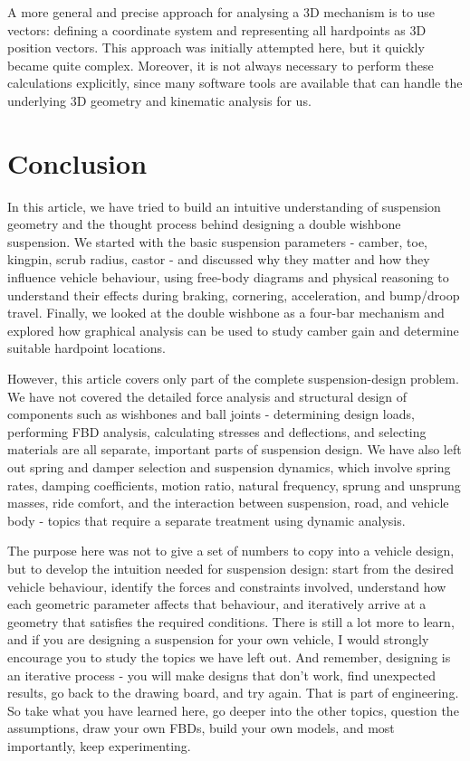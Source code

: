 \documentclass[12pt,a4paper]{article}
\begin{document}
A more general and precise approach for analysing a 3D mechanism is to use vectors: defining a coordinate system and representing all hardpoints as 3D position vectors. This approach was initially attempted here, but it quickly became quite complex. Moreover, it is not always necessary to perform these calculations explicitly, since many software tools are available that can handle the underlying 3D geometry and kinematic analysis for us.

\section{Conclusion}
In this article, we have tried to build an intuitive understanding of suspension geometry and the thought process behind designing a double wishbone suspension. We started with the basic suspension parameters - camber, toe, kingpin, scrub radius, castor - and discussed why they matter and how they influence vehicle behaviour, using free-body diagrams and physical reasoning to understand their effects during braking, cornering, acceleration, and bump/droop travel. Finally, we looked at the double wishbone as a four-bar mechanism and explored how graphical analysis can be used to study camber gain and determine suitable hardpoint locations.

However, this article covers only part of the complete suspension-design problem. We have not covered the detailed force analysis and structural design of components such as wishbones and ball joints - determining design loads, performing FBD analysis, calculating stresses and deflections, and selecting materials are all separate, important parts of suspension design. We have also left out spring and damper selection and suspension dynamics, which involve spring rates, damping coefficients, motion ratio, natural frequency, sprung and unsprung masses, ride comfort, and the interaction between suspension, road, and vehicle body - topics that require a separate treatment using dynamic analysis.

The purpose here was not to give a set of numbers to copy into a vehicle design, but to develop the intuition needed for suspension design: start from the desired vehicle behaviour, identify the forces and constraints involved, understand how each geometric parameter affects that behaviour, and iteratively arrive at a geometry that satisfies the required conditions.
There is still a lot more to learn, and if you are designing a suspension for your own vehicle, I would strongly encourage you to study the topics we have left out. And remember, designing is an iterative process - you will make designs that don't work, find unexpected results, go back to the drawing board, and try again. That is part of engineering. So take what you have learned here, go deeper into the other topics, question the assumptions, draw your own FBDs, build your own models, and most importantly, keep experimenting.
\end{document}
